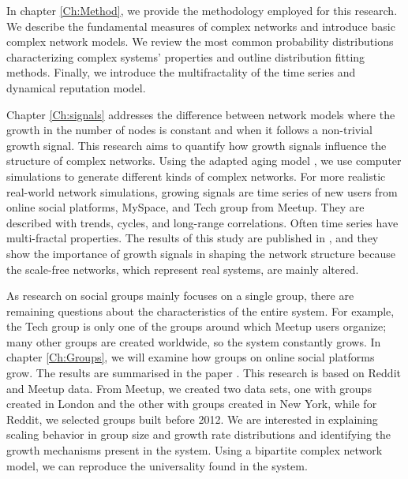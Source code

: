 In chapter \ref{Ch:Method}, we provide the methodology employed for this research. We describe the fundamental measures of complex networks and introduce basic complex network models. We review the most common probability distributions characterizing complex systems' properties and outline distribution fitting methods. Finally, we introduce the multifractality of the time series and dynamical reputation model. 

Chapter \ref{Ch:signals} addresses the difference between network models where the growth in the number of nodes is constant and when it follows a non-trivial growth signal. This research aims to quantify how growth signals influence the structure of complex networks. Using the adapted aging model \cite{hajra2004}, we use computer simulations to generate different kinds of complex networks. For more realistic real-world network simulations, growing signals are time series of new users from online social platforms, MySpace, and Tech group from Meetup. They are described with trends, cycles, and long-range correlations. Often time series have multi-fractal properties. The results of this study are published in \cite{vranic2021growth}, and they show the importance of growth signals in shaping the network structure because the scale-free networks, which represent real systems, are mainly altered. 

As research on social groups mainly focuses on a single group, there are remaining questions about the characteristics of the entire system. For example, the Tech group is only one of the groups around which Meetup users organize; many other groups are created worldwide, so the system constantly grows. In chapter \ref{Ch:Groups}, we will examine how groups on online social platforms grow. The results are summarised in the paper  \cite{vranic2022universal}. This research is based on Reddit and Meetup data. From Meetup, we created two data sets, one with groups created in London and the other with groups created in New York, while for Reddit, we selected groups built before 2012. We are interested in explaining scaling behavior in group size and growth rate distributions and identifying the growth mechanisms present in the system. Using a bipartite complex network model, we can reproduce the universality found in the system.

